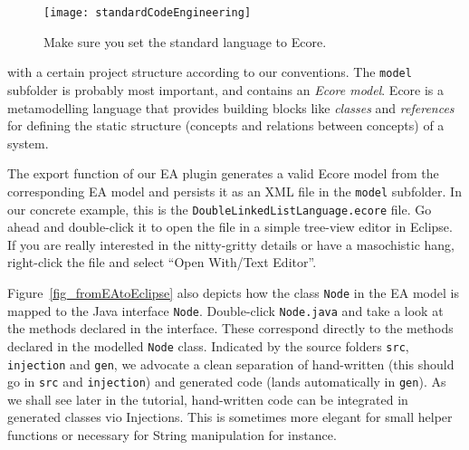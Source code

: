 \newpage
\visHeader

\begin{figure}[htbp]
    \centering
    \texttt{[image: standardCodeEngineering]}
    \caption{Make sure you set the standard language to Ecore.}
    \label{fig_standardSCEEA}
 \end{figure}

with a certain project structure according to our conventions.  
The  \texttt{model} subfolder is probably most important, and contains an  \emph{Ecore model}.  
Ecore is a metamodelling language that provides building  blocks like \emph{classes} and \emph{references} for defining the  static structure (concepts and relations between concepts) of a system.  

The  export function of our EA plugin generates a valid Ecore model from the  corresponding EA model and persists it as an XML file in the \texttt{model}  subfolder.  
In our concrete example, this is the \texttt{DoubleLinkedListLanguage.ecore} file.  
Go ahead and double-click it to open the file in a simple tree-view editor in Eclipse.  
If you are really interested in the nitty-gritty details or have a masochistic hang, right-click the file and select ``Open With/Text Editor''.

Figure~\ref{fig_fromEAtoEclipse} also depicts how the class \texttt{Node} in the EA model is mapped to the Java interface \texttt{Node}.  
Double-click \texttt{Node.java} and take a look at the methods declared in the interface.
These correspond directly to the methods declared in the modelled \texttt{Node} class.  
Indicated by the source folders \texttt{src}, \texttt{injection} and \texttt{gen}, we advocate a clean separation of hand-written (this should go in \texttt{src} and \texttt{injection}) and generated code (lands automatically in \texttt{gen}).  
As we shall see later in the tutorial, hand-written code can be integrated in generated classes vio Injections. 
This is sometimes more elegant for small helper functions or necessary for String manipulation for instance.
